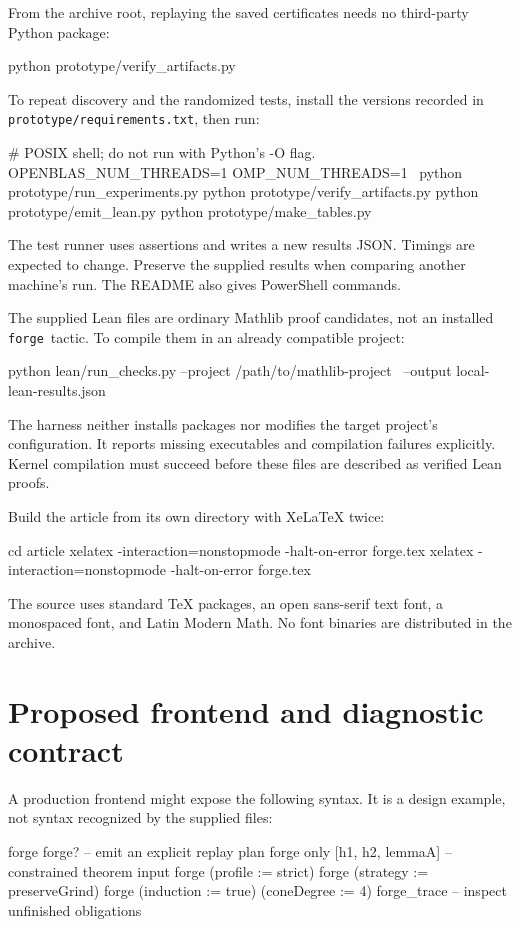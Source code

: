 \documentclass[11pt,a4paper]{article}
\newcommand{\forge}{\texttt{forge}}
\newcommand{\codepath}[1]{\nolinkurl{#1}}
\begin{document}
From the archive root, replaying the saved certificates needs no third-party Python package:
\begin{code}
python prototype/verify_artifacts.py
\end{code}
To repeat discovery and the randomized tests, install the versions recorded in \codepath{prototype/requirements.txt}, then run:
\begin{code}
# POSIX shell; do not run with Python's -O flag.
OPENBLAS_NUM_THREADS=1 OMP_NUM_THREADS=1 \
  python prototype/run_experiments.py
python prototype/verify_artifacts.py
python prototype/emit_lean.py
python prototype/make_tables.py
\end{code}
The test runner uses assertions and writes a new results JSON. Timings are expected to change. Preserve the supplied results when comparing another machine's run. The README also gives PowerShell commands.

The supplied Lean files are ordinary Mathlib proof candidates, not an installed \forge\ tactic. To compile them in an already compatible project:
\begin{code}
python lean/run_checks.py --project /path/to/mathlib-project \
  --output local-lean-results.json
\end{code}
The harness neither installs packages nor modifies the target project's configuration. It reports missing executables and compilation failures explicitly. Kernel compilation must succeed before these files are described as verified Lean proofs.

Build the article from its own directory with XeLaTeX twice:
\begin{code}
cd article
xelatex -interaction=nonstopmode -halt-on-error forge.tex
xelatex -interaction=nonstopmode -halt-on-error forge.tex
\end{code}
The source uses standard TeX packages, an open sans-serif text font, a monospaced font, and Latin Modern Math. No font binaries are distributed in the archive.

\section{Proposed frontend and diagnostic contract}

A production frontend might expose the following syntax. It is a design example, not syntax recognized by the supplied files:
\begin{code}
forge
forge?                        -- emit an explicit replay plan
forge only [h1, h2, lemmaA]    -- constrained theorem input
forge (profile := strict)
forge (strategy := preserveGrind)
forge (induction := true) (coneDegree := 4)
forge_trace                   -- inspect unfinished obligations
\end{code}
\end{document}
